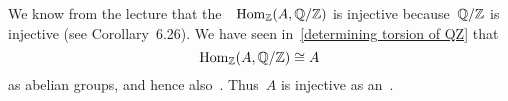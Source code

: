 \section{}

We know from the lecture that the~{}~$\operatorname{Hom}_{\mathbb{Z}}(A,\mathbb{Q}/\mathbb{Z})$ is injective because~$\mathbb{Q}/\mathbb{Z}$ is injective (see Corollary~6.26).
We have seen in~\eqref{determining torsion of QZ} that
\[
  \operatorname{Hom}_{\mathbb{Z}}(A,\mathbb{Q}/\mathbb{Z})
  \cong
  A
\]
as abelian groups, and hence also~.
Thus~$A$ is injective as an~{}.
